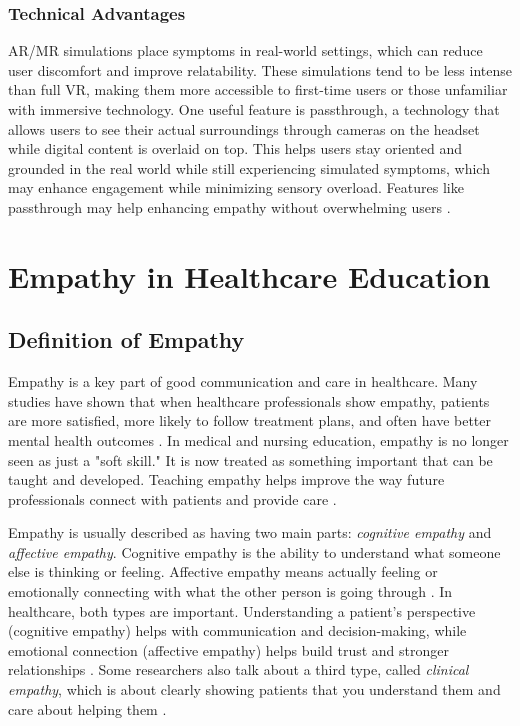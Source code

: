 \subsubsection{Technical Advantages}

AR/MR simulations place symptoms in real-world settings, which can reduce user discomfort and improve relatability. These simulations tend to be less intense than full VR, making them more accessible to first-time users or those unfamiliar with immersive technology. One useful feature is passthrough, a technology that allows users to see their actual surroundings through cameras on the headset while digital content is overlaid on top. This helps users stay oriented and grounded in the real world while still experiencing simulated symptoms, which may enhance engagement while minimizing sensory overload. Features like passthrough may help enhancing empathy without overwhelming users \cite{Krogmeier2024, Silva2017, Lan2023}.

\section{Empathy in Healthcare Education}

\subsection{Definition of Empathy}
Empathy is a key part of good communication and care in healthcare. Many studies have shown that when healthcare professionals show empathy, patients are more satisfied, more likely to follow treatment plans, and often have better mental health outcomes \cite{Cunico2012, Olson1995, Ozcan2018}. In medical and nursing education, empathy is no longer seen as just a "soft skill." It is now treated as something important that can be taught and developed. Teaching empathy helps improve the way future professionals connect with patients and provide care \cite{Cunico2012}.

Empathy is usually described as having two main parts: \textit{cognitive empathy} and \textit{affective empathy}. Cognitive empathy is the ability to understand what someone else is thinking or feeling. Affective empathy means actually feeling or emotionally connecting with what the other person is going through \cite{Ventura2020, Martingano2021}. In healthcare, both types are important. Understanding a patient's perspective (cognitive empathy) helps with communication and decision-making, while emotional connection (affective empathy) helps build trust and stronger relationships \cite{Cunico2012, Ozcan2018}. Some researchers also talk about a third type, called \textit{clinical empathy}, which is about clearly showing patients that you understand them and care about helping them \cite{Hojat2002}.

